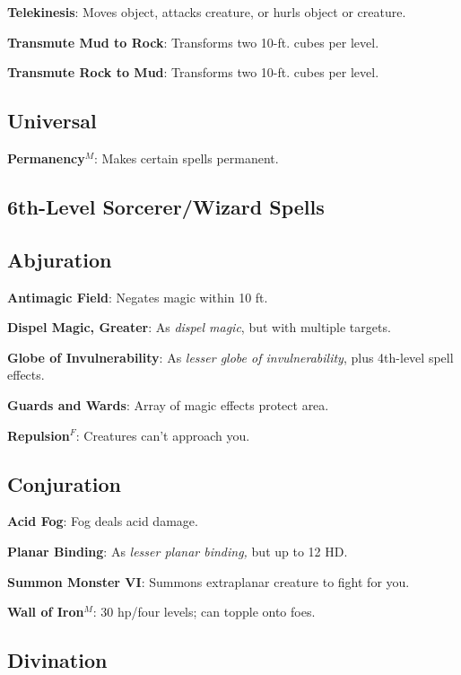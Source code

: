 \textbf{Telekinesis}: Moves object, attacks creature, or hurls object or creature.

\textbf{Transmute Mud to Rock}: Transforms two 10-ft. cubes per level.

\textbf{Transmute Rock to Mud}: Transforms two 10-ft. cubes per level.

\subsection{Universal}


\textbf{Permanency}\(^{M}\): Makes certain spells permanent.

\subsection{6th-Level Sorcerer/Wizard Spells}


\subsection{Abjuration}


\textbf{Antimagic Field}: Negates magic within 10 ft.

\textbf{Dispel Magic, Greater}: As \textit{dispel magic}, but with multiple targets.

\textbf{Globe of Invulnerability}: As \textit{lesser globe of invulnerability}, plus 4th-level spell effects.

\textbf{Guards and Wards}: Array of magic effects protect area.

\textbf{Repulsion}\(^{F}\): Creatures can't approach you.

\subsection{Conjuration}


\textbf{Acid Fog}: Fog deals acid damage.

\textbf{Planar Binding}: As \textit{lesser planar binding, }but up to 12 HD.

\textbf{Summon Monster VI}: Summons extraplanar creature to fight for you.

\textbf{Wall of Iron}\(^{M}\): 30 hp/four levels; can topple onto foes.

\subsection{Divination}


